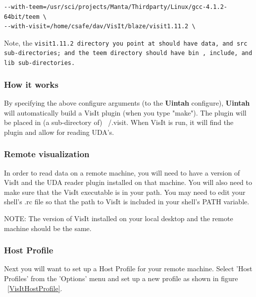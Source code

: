 \documentclass[12pt]{article}
\begin{document}
\begin{verbatim}
--with-teem=/usr/sci/projects/Manta/Thirdparty/Linux/gcc-4.1.2-64bit/teem \
--with-visit=/home/csafe/dav/VisIt/blaze/visit1.11.2 \
\end{verbatim}

Note, the \tt visit1.11.2 \normalfont directory you point at should
have \tt data\normalfont , and \tt src \normalfont sub-directories;
and the \tt teem \normalfont directory should have \tt bin\normalfont
, \tt include\normalfont , and \tt lib \normalfont sub-directories.

\subsubsection{How it works}
By specifying the above configure arguments (to the \textbf{Uintah}
configure), \textbf{Uintah} will automatically build a VisIt plugin
(when you type "make"). The plugin will be placed in (a sub-directory
of) ~/.visit. When VisIt is run, it will find the plugin and allow for
reading UDA's.

\subsubsection{Remote visualization}
In order to read data on a remote machine, you will need to have a
version of VisIt and the UDA reader plugin installed on that
machine. You will also need to make sure that the VisIt executable is
in your path. You may need to edit your shell's .rc file so that the
path to VisIt is included in your shell's PATH variable.

NOTE: The version of VisIt installed on your local desktop and the
remote machine should be the same.

\subsubsection{Host Profile}
Next you will want to set up a Host Profile for your remote
machine. Select 'Host Profiles' from the 'Options' menu and set up a
new profile as shown in figure ~\ref{VisItHostProfile}.
\end{document}

